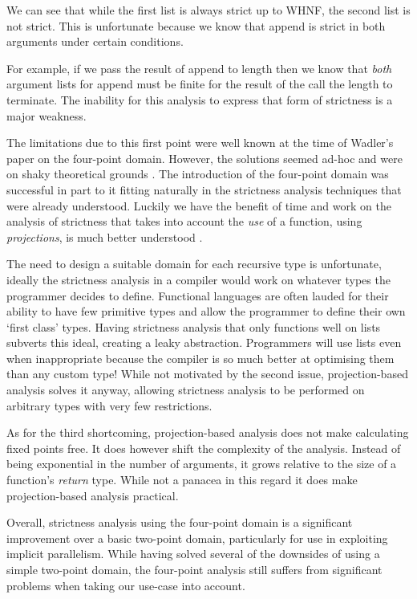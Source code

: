 We can see that while the first list is always strict up to WHNF, the second
list is not strict. This is unfortunate because we know that \<append\> is
strict in both arguments under certain conditions.

For example, if we pass the result of \<append\> to \<length\> then we know
that \emph{both} argument lists for \<append\> must be finite for the result
of the call the \<length\> to terminate. The inability for this analysis
to express that form of strictness is a major weakness.

The limitations due to this first point were well known at the time of Wadler's
paper on the four-point domain. However, the solutions seemed ad-hoc and were
on shaky theoretical grounds \citep{hughes1986strictness, hughes1987analysing}. The
introduction of the four-point domain was successful in part to it fitting
naturally in the strictness analysis techniques that were already understood.
Luckily we have the benefit of time and work on the analysis of strictness that
takes into account the \emph{use} of a function, using \emph{projections}, is
much better understood \citep{hinze1995projection, SergeyDemand}.

The need to design a suitable domain for each recursive type is unfortunate,
ideally the strictness analysis in a compiler would work on whatever types the
programmer decides to define. Functional languages are often lauded for their
ability to have few primitive types and allow the programmer to define their
own `first class' types.  Having strictness analysis that only functions well
on lists subverts this ideal, creating a leaky abstraction. Programmers will
use lists even when inappropriate because the compiler is so much better at
optimising them than any custom type! While not motivated by the second issue,
projection-based analysis solves it anyway, allowing strictness analysis to be
performed on arbitrary types with very few restrictions.

As for the third shortcoming, projection-based analysis does not make
calculating fixed points free. It does however shift the complexity of the
analysis. Instead of being exponential in the number of arguments, it grows
relative to the size of a function's \emph{return} type. While not a panacea in
this regard it does make projection-based analysis practical.

Overall, strictness analysis using the four-point domain is a significant
improvement over a basic two-point domain, particularly for use in exploiting
implicit parallelism. While having solved several of the downsides of using
a simple two-point domain, the four-point analysis still suffers from
significant problems when taking our use-case into account.
